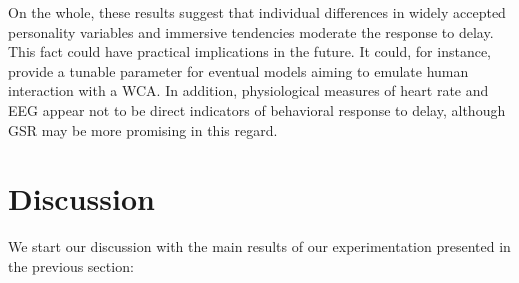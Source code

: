 On the whole, these results suggest that individual differences in widely accepted personality variables and immersive tendencies moderate the response to delay.
This fact could have practical implications in the future.
It could, for instance, provide a tunable parameter for eventual models aiming to emulate human interaction with a WCA.\@
In addition, physiological measures of heart rate and EEG appear not to be direct indicators of  behavioral response to delay, although GSR may be more promising in this regard.

\section{Discussion}\label{sec:discussion}

We start our discussion with the main results of our experimentation presented in the previous section:

